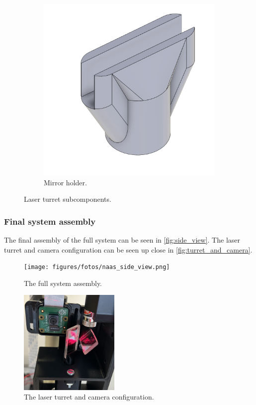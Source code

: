 \begin{figure}[!htb]
\begin{subfigure}{0.3\textwidth}
    \includegraphics[width=0.7\linewidth]{figures/hardware_design/mirror_holder.png}
    \caption{Mirror holder.}
  \end{subfigure}
  \caption{Laser turret subcomponents.}
  \label{fig:turret_subcomponents}
\end{figure}


\subsubsection{Final system assembly}
The final assembly of the full system can be seen in \autoref{fig:side_view}.
The laser turret and camera configuration can be seen up close in \autoref{fig:turret_and_camera}.
\begin{figure}[!htb]
  \centering
  \texttt{[image: figures/fotos/naas\_side\_view.png]}
  \caption{The full system assembly.}
  \label{fig:side_view}
\end{figure}
\begin{figure}[!htb]
  \centering
  \includegraphics[width=0.43\textwidth]{figures/fotos/turret_and_camera_cropped.jpg}
  \caption{The laser turret and camera configuration.}
  \label{fig:turret_and_camera}
\end{figure}


